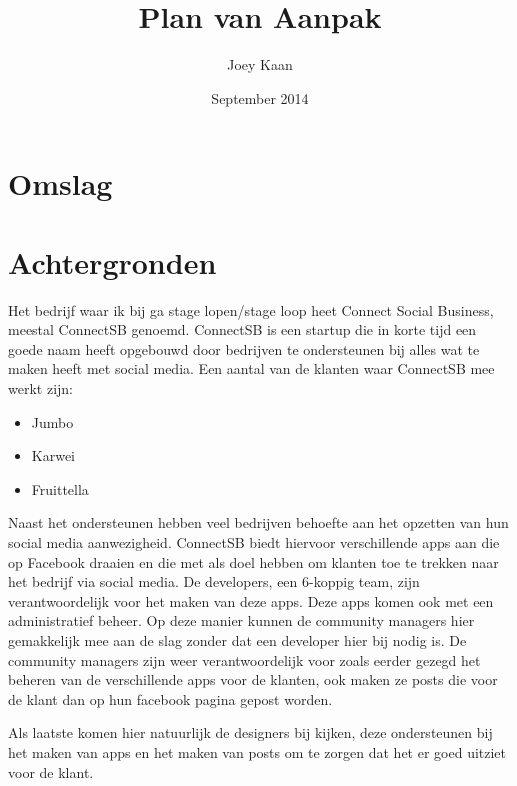 \documentclass{article}
\title{Plan van Aanpak}
\author{Joey Kaan}
\date{September 2014}
\begin{document}
\section{Omslag}
\clearpage

\maketitle
\clearpage

\tableofcontents
\clearpage

\section{Achtergronden}
Het bedrijf waar ik bij ga stage lopen/stage loop heet Connect Social Business, meestal ConnectSB genoemd. ConnectSB is een startup die in korte tijd een goede naam heeft opgebouwd door bedrijven te ondersteunen bij alles wat te maken heeft met social media. Een aantal van de klanten waar ConnectSB mee werkt zijn:
\begin{itemize}
\item Jumbo
\item Karwei
\item Fruittella
\end{itemize}
Naast het ondersteunen hebben veel bedrijven behoefte aan het opzetten van hun social media aanwezigheid. ConnectSB biedt hiervoor verschillende apps aan die op Facebook draaien en die met als doel hebben om klanten toe te trekken naar het bedrijf via social media. De developers, een 6-koppig team, zijn verantwoordelijk voor het maken van deze apps. Deze apps komen ook met een administratief beheer. Op deze manier kunnen de community managers hier gemakkelijk mee aan de slag zonder dat een developer hier bij nodig is. De community managers zijn weer verantwoordelijk voor zoals eerder gezegd het beheren van de verschillende apps voor de klanten, ook maken ze posts die voor de klant dan op hun facebook pagina gepost worden.

Als laatste komen hier natuurlijk de designers bij kijken, deze ondersteunen bij het maken van apps en het maken van posts om te zorgen dat het er goed uitziet voor de klant.
\end{document}
